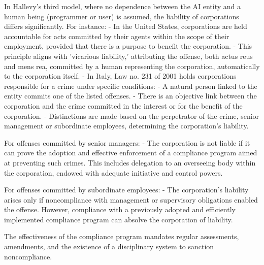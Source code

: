 In Hallevy's third model, where no dependence between the AI entity and a human being (programmer or user) is assumed, the liability of corporations differs significantly. For instance:
- In the United States, corporations are held accountable for acts committed by their agents within the scope of their employment, provided that there is a purpose to benefit the corporation.
- This principle aligns with 'vicarious liability,' attributing the offense, both actus reus and mens rea, committed by a human representing the corporation, automatically to the corporation itself.
- In Italy, Law no. 231 of 2001 holds corporations responsible for a crime under specific conditions:
    - A natural person linked to the entity commits one of the listed offenses.
    - There is an objective link between the corporation and the crime committed in the interest or for the benefit of the corporation.
    - Distinctions are made based on the perpetrator of the crime, senior management or subordinate employees, determining the corporation's liability.

For offenses committed by senior managers:
- The corporation is not liable if it can prove the adoption and effective enforcement of a compliance program aimed at preventing such crimes. This includes delegation to an overseeing body within the corporation, endowed with adequate initiative and control powers.

For offenses committed by subordinate employees:
- The corporation's liability arises only if noncompliance with management or supervisory obligations enabled the offense. However, compliance with a previously adopted and efficiently implemented compliance program can absolve the corporation of liability.

The effectiveness of the compliance program mandates regular assessments, amendments, and the existence of a disciplinary system to sanction noncompliance.

